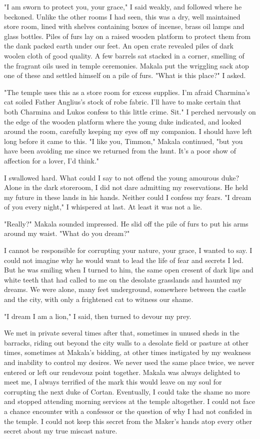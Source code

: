 \documentclass{article}
\begin{document}
"I am sworn to protect you, your grace," I said weakly, and followed where he beckoned. Unlike the other rooms I had seen, this was a dry, well maintained store room, lined with shelves containing boxes of incense, brass oil lamps and glass bottles. Piles of furs lay on a raised wooden platform to protect them from the dank packed earth under our feet. An open crate revealed piles of dark woolen cloth of good quality. A few barrels sat stacked in a corner, smelling of the fragrant oils used in temple ceremonies. Makala put the wriggling sack atop one of these and settled himself on a pile of furs. "What is this place?" I asked.

"The temple uses this as a store room for excess supplies. I'm afraid Charmina's cat soiled Father Anglius's stock of robe fabric. I'll have to make certain that both Charmina and Lukos confess to this little crime. Sit." I perched nervously on the edge of the wooden platform where the young duke indicated, and looked around the room, carefully keeping my eyes off my companion. I should have left long before it came to this. "I like you, Timmon," Makala continued, "but you have been avoiding me since we returned from the hunt. It's a poor show of affection for a lover, I'd think."

I swallowed hard. What could I say to not offend the young amourous duke? Alone in the dark storeroom, I did not dare admitting my reservations. He held my future in these lands in his hands. Neither could I confess my fears. "I dream of you every night," I whispered at last. At least it was not a lie.

"Really?" Makala sounded impressed. He slid off the pile of furs to put his arms around my waist. "What do you dream?"

I cannot be responsible for corrupting your nature, your grace, I wanted to say. I could not imagine why he would want to lead the life of fear and secrets I led. But he was smiling when I turned to him, the same open cresent of dark lips and white teeth that had called to me on the desolate grasslands and haunted my dreams. We were alone, many feet underground, somewhere between the castle and the city, with only a frightened cat to witness our shame.

"I dream I am a lion," I said, then turned to devour my prey.

\vspace{.5cm}

We met in private several times after that, sometimes in unused sheds in the barracks, riding out beyond the city walls to a desolate field or pasture at other times, sometimes at Makala's bidding, at other times instigated by my weakness and inability to control my desires. We never used the same place twice, we never entered or left our rendevouz point together. Makala was always delighted to meet me, I always terrified of the mark this would leave on my soul for corrupting the next duke of Cortan. Eventually, I could take the shame no more and stopped attending morning services at the temple altogether. I could not face a chance encounter with a confessor or the question of why I had not confided in the temple. I could not keep this secret from the Maker's hands atop every other secret about my true miscast nature. 
\end{document}
